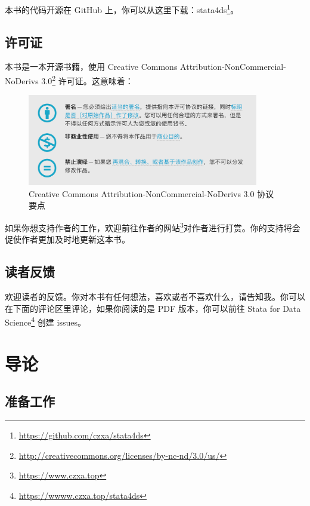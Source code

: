 \documentclass[]{ctexbook}
\renewcommand{\href}[2]{#2\footnote{\url{#1}}}
\begin{document}
本书的代码开源在 GitHub 上，你可以从这里下载：\href{https://github.com/czxa/stata4ds}{stata4ds}。

\hypertarget{section-6}{%
\section{许可证}\label{section-6}}

本书是一本开源书籍，使用 \href{http://creativecommons.org/licenses/by-nc-nd/3.0/us/}{Creative Commons Attribution-NonCommercial-NoDerivs 3.0} 许可证。这意味着：

\begin{figure}

{\centering \includegraphics[width=0.9\textwidth]{assets/license} 

}

\caption{Creative Commons Attribution-NonCommercial-NoDerivs 3.0 协议要点}\label{fig:cca}
\end{figure}

如果你想支持作者的工作，欢迎前往\href{https://www.czxa.top}{作者的网站}对作者进行打赏。你的支持将会促使作者更加及时地更新这本书。

\hypertarget{section-7}{%
\section{读者反馈}\label{section-7}}

欢迎读者的反馈。你对本书有任何想法，喜欢或者不喜欢什么，请告知我。你可以在下面的评论区里评论，如果你阅读的是 PDF 版本，你可以前往 \href{https://wwww.czxa.top/stata4ds}{Stata for Data Science} 创建 issues。

\mainmatter

\hypertarget{section-8}{%
\chapter{导论}\label{section-8}}

\hypertarget{section-9}{%
\section{准备工作}\label{section-9}}
\end{document}
